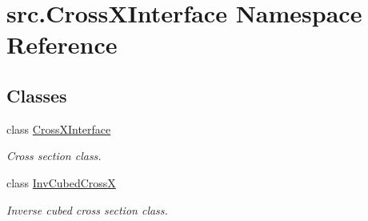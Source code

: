 \hypertarget{namespacesrc_1_1_cross_x_interface}{\section{src.\-Cross\-X\-Interface Namespace Reference}
\label{namespacesrc_1_1_cross_x_interface}
}
\subsection*{Classes}
\begin{DoxyCompactItemize}
\item 
class \hyperlink{classsrc_1_1_cross_x_interface_1_1_cross_x_interface}{Cross\-X\-Interface}
\begin{DoxyCompactList}\small\item\em Cross section class. \end{DoxyCompactList}\item 
class \hyperlink{classsrc_1_1_cross_x_interface_1_1_inv_cubed_cross_x}{Inv\-Cubed\-Cross\-X}
\begin{DoxyCompactList}\small\item\em Inverse cubed cross section class. \end{DoxyCompactList}\end{DoxyCompactItemize}
